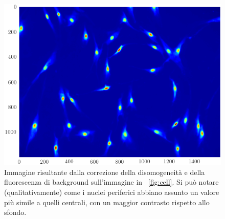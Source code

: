 \begin{figure}
 \centering
 \includegraphics[scale=.64]{img/CAP3cellcorr.png}
 \caption{\small{Immagine risultante dalla correzione della disomogeneità e della fluorescenza di background sull'immagine in \figurename~\ref{fig:cell}. Si può notare (qualitativamente) come i nuclei periferici abbiano assunto un valore più simile a quelli centrali, con un maggior contrasto rispetto allo sfondo.}}
 \label{fig:cellcorr}
\end{figure}